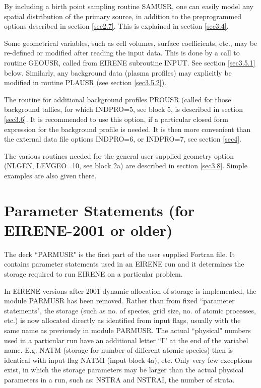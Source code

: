 By including a birth point sampling routine SAMUSR, one can easily
model any spatial distribution of the primary source, in addition to the
preprogrammed options described in section \ref{sec2.7}.
This is explained in section \ref{sec3.4}.

Some geometrical variables, such as cell volumes, surface coefficients,
etc., may be re-defined or modified after reading the input data.
This is done by a call to routine GEOUSR, called from EIRENE
subroutine INPUT. See section \ref{sec3.5.1} below. Similarly,
any background data (plasma profiles) may explicitly be modified
in routine PLAUSR (see section \ref{sec3.5.2}).

The routine for additional background profiles PROUSR (called for
those background tallies, for which INDPRO=5, see block 5, is described
in section \ref{sec3.6}. It is recommended to use this option,
if a particular closed form expression for the background profile
is needed. It is then more convenient than the external data file
options INDPRO=6, or INDPRO=7, see section \ref{sec4}.

The various routines needed for the general user supplied geometry
option (NLGEN, LEVGEO=10, see block 2a) are described in section
\ref{sec3.8}. Simple examples are also given there.
\newpage

\section{Parameter Statements (for EIRENE-2001 or older)} \label{sec3.1}
The deck ``PARMUSR" is the first part of the user
supplied Fortran
file. It contains parameter statements used in an EIRENE run
and it determines the storage required to run EIRENE on a particular
problem.

In EIRENE versions after 2001 dynamic allocation of storage is implemented, the module
PARMUSR has been removed.
Rather than from fixed ``parameter statements", the storage (such as no. of species, grid size, no. of atomic processes, etc.) is now allocated directly
as identified from input flags, usually with the same name as previously in module PARMUSR.
The actual ``physical" numbers used in a particular run have an additional letter ``I'' at the end of the variabel name.
E.g.  NATM  (storage for number of different atomic species)
then is identical with input flag NATMI (input block 4a),
etc. Only very few exceptions exist,
in which the storage parameters may be larger than the actual physical parameters in a run,
such as: NSTRA and NSTRAI, the number of strata.

